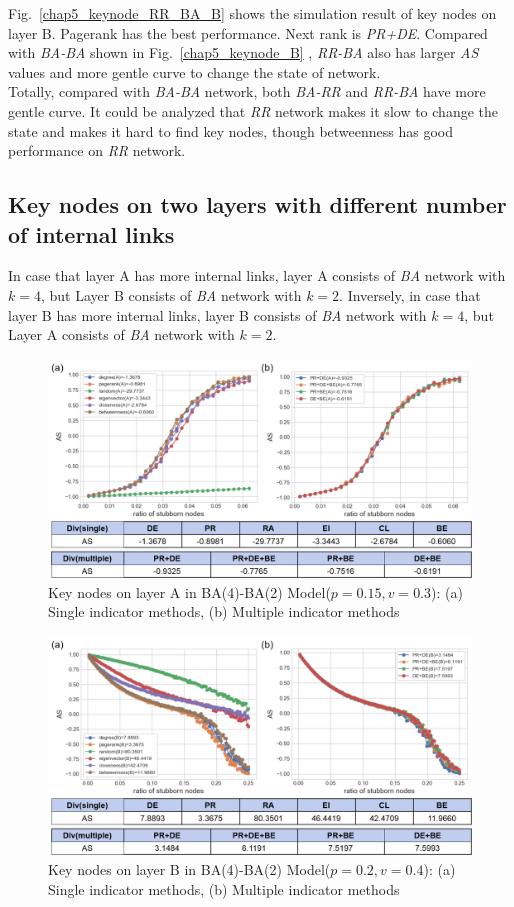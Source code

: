 Fig.~\ref{chap5_keynode_RR_BA_B} shows the simulation result of key nodes on layer B. Pagerank has the best performance. Next rank is \textit{PR+DE}.  Compared with \textit{BA-BA} shown in Fig.~\ref{chap5_keynode_B} , \textit{RR-BA} also has larger \textit{AS} values and more gentle curve to change the state of network. \\ 
Totally, compared with \textit{BA-BA} network, both \textit{BA-RR} and \textit{RR-BA} have more gentle curve. It could be analyzed that \textit{RR} network makes it slow to change the state and makes it hard to find key nodes, though betweenness has good performance on \textit{RR} network.  


\subsection{Key nodes on two layers with different number of internal links}
In case that layer A has more internal links, layer A consists of \textit{BA} network with $k=4$, but Layer B consists of \textit{BA} network with $k=2$. Inversely, in case that layer B has more internal links, layer B consists of \textit{BA} network with $k=4$, but Layer A consists of \textit{BA} network with $k=2$. 
\begin{figure}[!htb]
	\centering
	\includegraphics[width=\hsize]{figure/chap5_keynode_internal_A.png}
	\caption{Key nodes on layer A in BA(4)-BA(2) Model($p=0.15, v=0.3$):
		(a) Single indicator methods, (b) Multiple indicator methods}
	\label{chap5_keynode_internal_A}
\end{figure}
\begin{figure}[!htb]
	\centering
	\includegraphics[width=\hsize]{figure/chap5_keynode_internal_B.png}
	\caption{Key nodes on layer B in BA(4)-BA(2) Model($p=0.2, v=0.4$):
		(a) Single indicator methods, (b) Multiple indicator methods}
	\label{chap5_keynode_internal_B}
\end{figure}
